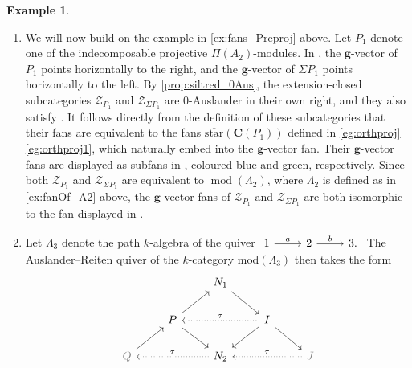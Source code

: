 \documentclass[10pt,twoside, a4paper,reqno]{amsart}
\DeclareMathOperator{\mods}{mod}
\DeclareMathOperator{\proj}{proj}
\newcommand{\R}{\mathbb{R}}
\newcommand{\calZ}{\mathcal{Z}}
\newcommand{\boldC}{\mathbf{C}}
\newcommand{\K}{\mathrm{K}}
\newcommand{\bfg}{\mathbf{g}}
\theoremstyle{definition}
\newtheorem{example}[theorem]{Example}
\begin{document}
\begin{example}
\begin{enumerate}
\begin{figure}[ht!]
    \end{figure}
    This is a finite polyhedral fan in $\K_0(\proj \Lambda_{2})_{\R}\simeq \R^2$, but it is not complete.
    \item\label{ex:fans_PreprojZ} 
    We will now build on the example in \eqref{ex:fans_Preproj} above. Let $P_{1}$ denote one of the indecomposable projective $\Pi(A_2)$-modules. In , the $\bfg$-vector of $P_{1}$ points horizontally to the right, and the $\bfg$-vector of $\Sigma P_{1}$ point{s} horizontally to the left. By \eqref{prop:siltred_0Aus}, the extension-closed subcategories $\calZ_{P_{1}}$ and $\calZ_{\Sigma P_{1}}$ are 0-Auslander in their own right, and they also satisfy . {It follows directly from the definition of these subcategories that their fans are equivalent to the fans $\overline{\mathrm{star}}(\boldC(P_1))$ defined in \cref{eg:orthproj}\eqref{eg:orthproj1}, which naturally embed into the $\bfg$-vector fan.} Their $\bfg$-vector fans are displayed as subfans in , coloured \textcolor{friendly_deepblue}{blue} and \textcolor{friendly_green}{green}, respectively. Since both $\calZ_{P_{1}}$ and $\calZ_{\Sigma P_{1}}$ are equivalent to $\mods(\Lambda_2)$, where $\Lambda_2$ is defined as in \eqref{ex:fanOf_A2} above, the $\bfg$-vector fans of $\calZ_{P_{1}}$ and $\calZ_{\Sigma P_{1}}$ are both isomorphic to the fan displayed in .
    \item\label{ex:fans_subA3} Let $\Lambda_3$ denote the path $k$-algebra of the quiver 
$
\begin{tikzcd}
	1 \arrow[r,"a"] & 2 \arrow[r,"b"] & 3.
\end{tikzcd}
$
The Auslander--Reiten quiver of the $k$-category $\mathrm{mod}(\Lambda_3)$ then takes the form
\begin{equation*}
	\begin{tikzcd}
             &                         & N_1 \arrow[rd]                                &                                                                   &                                             \\
             & P \arrow[ru] \arrow[rd] &                                               & I \arrow[rd] \arrow[ld] \arrow[ll, "{\scriptstyle\tau}"', dotted] &                                             \\
	\textcolor{gray}{Q} \arrow[ru] &                         & N_2 \arrow[ll, "{\scriptstyle\tau}"', dotted] &                                                                   & \textcolor{gray}{J} \arrow[ll, "{\scriptstyle\tau}"', dotted]

\end{tikzcd}
\end{equation*}
\end{enumerate}
\end{example}
\end{document}

